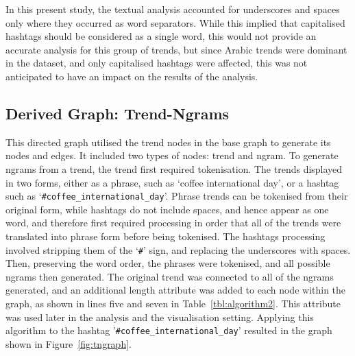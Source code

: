 \documentclass[utf8]{frontiersSCNS} %
\begin{document}
In this present study, the textual analysis accounted for underscores and spaces only where they occurred as word separators. While this implied that capitalised hashtags should be considered as a single word, this would not provide an accurate analysis for this group of trends, but since Arabic trends were dominant in the dataset, and only capitalised hashtags were affected, this was not anticipated to have an impact on the results of the analysis.


\subsection{Derived Graph: Trend-Ngrams}

This directed graph utilised the trend nodes in the base graph to generate its nodes and edges. It included two types of nodes: trend and ngram. To generate ngrams from a trend, the trend first required tokenisation. The trends displayed in two forms, either as a phrase, such as `coffee international day', or a hashtag such as `{\texttt{\#coffee\_international\_day}}'.  Phrase trends can be tokenised from their original form, while hashtags do not include spaces, and hence appear as one word, and therefore first required processing in order that all of the trends were translated into phrase form before being tokenised. The hashtags processing involved stripping them of the `{\texttt{\#}}' sign, and replacing the underscores with spaces. Then, preserving the word order, the phrases were tokenised, and all possible ngrams then generated.  The original trend was connected to all of the ngrams generated, and an additional length attribute was added to each node within the graph, as shown in lines five and seven in Table~\ref{tbl:algorithm2}.  This attribute was used later in the analysis and the visualisation setting. Applying this algorithm to the hashtag '{\texttt{\#coffee\_international\_day}}' resulted in the graph shown in Figure~\ref{fig:tngraph}.
\end{document}
